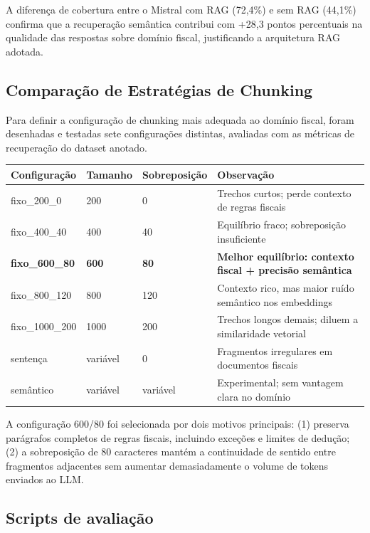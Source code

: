 \documentclass[11pt,a4paper,oneside]{article}
\begin{document}
A diferença de cobertura entre o Mistral com RAG (72,4\%) e sem RAG (44,1\%) confirma que a recuperação semântica contribui com +28,3 pontos percentuais na qualidade das respostas sobre domínio fiscal, justificando a arquitetura RAG adotada.

\subsection{Comparação de Estratégias de Chunking}

Para definir a configuração de chunking mais adequada ao domínio fiscal, foram desenhadas e testadas sete configurações distintas, avaliadas com as métricas de recuperação do dataset anotado.

\begin{center}
\begin{tabularx}{\textwidth}{@{}L{36mm}L{22mm}L{22mm}Y@{}}
\toprule
\textbf{Configuração} & \textbf{Tamanho} & \textbf{Sobreposição} & \textbf{Observação} \\
\midrule
fixo\_200\_0   & 200 & 0   & Trechos curtos; perde contexto de regras fiscais \\
fixo\_400\_40  & 400 & 40  & Equilíbrio fraco; sobreposição insuficiente \\
\textbf{fixo\_600\_80}  & \textbf{600} & \textbf{80}  & \textbf{Melhor equilíbrio: contexto fiscal + precisão semântica} \\
fixo\_800\_120 & 800 & 120 & Contexto rico, mas maior ruído semântico nos embeddings \\
fixo\_1000\_200 & 1000 & 200 & Trechos longos demais; diluem a similaridade vetorial \\
sentença       & variável & 0   & Fragmentos irregulares em documentos fiscais \\
semântico      & variável & variável & Experimental; sem vantagem clara no domínio \\
\bottomrule
\end{tabularx}
\end{center}

A configuração 600/80 foi selecionada por dois motivos principais: (1) preserva parágrafos completos de regras fiscais, incluindo exceções e limites de dedução; (2) a sobreposição de 80 caracteres mantém a continuidade de sentido entre fragmentos adjacentes sem aumentar demasiadamente o volume de tokens enviados ao LLM.

\subsection{Scripts de avaliação}
\end{document}
